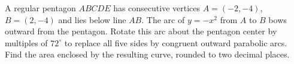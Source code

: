 A regular pentagon $ABCDE$ has consecutive vertices $A=(-2,-4)$, $B=(2,-4)$ and lies below line $AB$. The arc of $y=-x^2$ from $A$ to $B$ bows outward from the pentagon. Rotate this arc about the pentagon center by multiples of $72^\circ$ to replace all five sides by congruent outward parabolic arcs. Find the area enclosed by the resulting curve, rounded to two decimal places.
